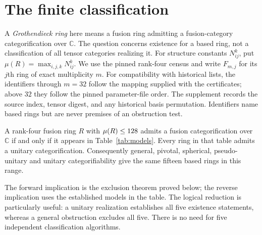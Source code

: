 \section{The finite classification}\label{sec:finite-statement}
A \emph{Grothendieck ring} here means a fusion ring admitting a fusion-category
categorification over $\mathbb C$. The question concerns existence for a
based ring, not a classification of all tensor categories realizing it.
For structure constants $N_{ij}^k$, put
$\mu(R)=\max_{i,j,k}N_{ij}^k$. We use the pinned rank-four census
\cite{Census} and write $F_{m,j}$ for its $j$th ring of exact multiplicity
$m$. For compatibility with historical lists, the identifiers through
$m=32$ follow the mapping supplied with the certificates; above $32$ they
follow the pinned parameter-file order. The supplement records the source
index, tensor digest, and any historical basis permutation. Identifiers
name based rings but are never premises of an obstruction test.

\begin{theorem}\label{thm:finite}
A rank-four fusion ring $R$ with $\mu(R)\leq128$ admits a fusion
categorification over $\mathbb C$ if and only if it appears in
Table~\ref{tab:models}. Every ring in that table admits a unitary
categorification. Consequently general, pivotal, spherical, pseudo-unitary
and unitary categorifiability give the same fifteen based rings in this range.
\end{theorem}

The forward implication is the exclusion theorem proved below; the reverse
implication uses the established models in the table. The logical reduction
is particularly useful: a unitary realization establishes all five existence
statements, whereas a general obstruction excludes all five. There is no
need for five independent classification algorithms.


